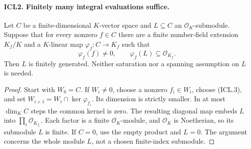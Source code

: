 \paragraph{ICL2. Finitely many integral evaluations suffice.}
\label{claim:ICL2}
Let \(C\) be a finite-dimensional \(K\)-vector space and
\(L\subseteq C\) an \(\mathcal O_K\)-submodule.  Suppose that for
every nonzero \(f\in C\) there are a finite number-field extension
\(K_f/K\) and a \(K\)-linear map \(\varphi_f:C\to K_f\) such that
\[
 \varphi_f(f)\ne0,\qquad \varphi_f(L)\subseteq\mathcal O_{K_f}.
                                                               \tag{ICL.3}
\]
Then \(L\) is finitely generated.  Neither saturation nor a spanning
assumption on \(L\) is needed.
\begin{proof}
Start with \(W_0=C\).  If \(W_i\ne0\), choose a nonzero
\(f_i\in W_i\), choose (ICL.3), and set
\(W_{i+1}=W_i\cap\ker\varphi_{f_i}\).  Its dimension is strictly
smaller.  In at most \(\dim_K C\) steps the common kernel is zero.
The resulting diagonal map embeds \(L\) into
\(\prod_i\mathcal O_{K_{f_i}}\).  Each factor is a finite
\(\mathcal O_K\)-module, and \(\mathcal O_K\) is Noetherian, so
its submodule \(L\) is finite.  If \(C=0\), use the empty product
and \(L=0\).  The argument concerns the whole module \(L\), not a
chosen finite-index submodule.
\end{proof}

